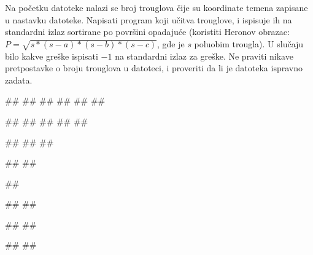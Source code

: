 \begin{Exercise}[label=A_05]
Na početku datoteke  nalazi se broj trouglova čije su koordinate temena zapisane u nastavku datoteke. Napisati
  program koji učitva trouglove, i ispisuje ih na standardni izlaz
  sortirane po površini opadajuće (koristiti Heronov obrazac: 
  $P = \sqrt{s*(s-a)*(s-b)*(s-c)}$, gde je $s$ poluobim trougla). U slučaju bilo kakve greške ispisati $-1$ na standardni izlaz za greške. Ne praviti nikave pretpostavke o broju trouglova u datoteci, i proveriti da li je datoteka ispravno zadata.

\begin{miditest}
\begin{test}{1}
##
##
##
##
##
##

#\naslovIzlaz#
##
##
##
##
\end{test}
\end{miditest}
\begin{minitest}
\begin{test}{2}
##
##
##

#\naslovIzlazZaGresku#
##
\end{test}
\end{minitest}

\begin{miditest}
\begin{test}{3}
##

#\naslovIzlazZaGresku#
##
\end{test}
\end{miditest}
\begin{minitest}
\begin{test}{4}
##
##

#\naslovIzlaz#
#\izlaz{}#
\end{test}
\end{minitest}

\end{Exercise}

\begin{Answer}[ref=A_05]
\end{Answer}

